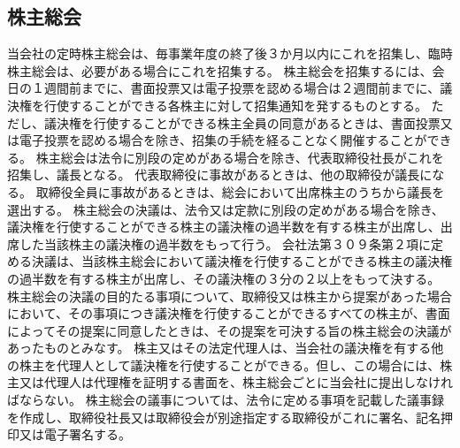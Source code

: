 \documentclass[10pt,a4paper,uplatex]{jsarticle}
\begin{document}
\subsection{株主総会}
当会社の定時株主総会は、毎事業年度の終了後３か月以内にこれを招集し、臨時株主総会は、必要がある場合にこれを招集する。
株主総会を招集するには、会日の１週間前までに、書面投票又は電子投票を認める場合は２週間前までに、議決権を行使することができる各株主に対して招集通知を発するものとする。 ただし、議決権を行使することができる株主全員の同意があるときは、書面投票又は電子投票を認める場合を除き、招集の手続を経ることなく開催することができる。
株主総会は法令に別段の定めがある場合を除き、代表取締役社長がこれを招集し、議長となる。
\term 代表取締役に事故があるときは、他の取締役が議長になる。
\term 取締役全員に事故があるときは、総会において出席株主のうちから議長を選出する。
株主総会の決議は、法令又は定款に別段の定めがある場合を除き、議決権を行使することができる株主の議決権の過半数を有する株主が出席し、出席した当該株主の議決権の過半数をもって行う。
\term 会社法第３０９条第２項に定める決議は、当該株主総会において議決権を行使することができる株主の議決権の過半数を有する株主が出席し、その議決権の３分の２以上をもって決する。
株主総会の決議の目的たる事項について、取締役又は株主から提案があった場合において、その事項につき議決権を行使することができるすべての株主が、書面によってその提案に同意したときは、その提案を可決する旨の株主総会の決議があったものとみなす。
株主又はその法定代理人は、当会社の議決権を有する他の株主を代理人として議決権を行使することができる。但し、この場合には、株主又は代理人は代理権を証明する書面を、株主総会ごとに当会社に提出しなければならない。
株主総会の議事については、法令に定める事項を記載した議事録を作成し、取締役社長又は取締役会が別途指定する取締役がこれに署名、記名押印又は電子署名する。
\end{document}
